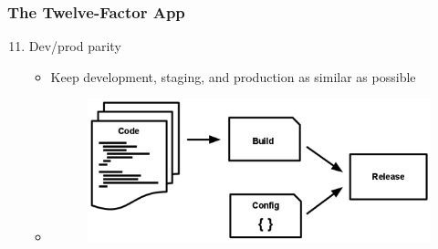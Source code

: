 \documentclass{beamer}
\begin{document}
	\begin{frame}
		\frametitle{The Twelve-Factor App}
		\begin{enumerate}
			\setcounter{enumi}{10}
			\item Dev/prod parity \\
			\begin{itemize}
				\item<1->[] \scriptsize{Keep development, staging, and production as similar as possible}
				\vspace{5mm}
				\item<1->[] 
				\begin{figure}[h]
					\includegraphics[width=100mm,scale=1]{img/release.png}
				\end{figure}
			\end{itemize}
		\end{enumerate}
		\vspace{100mm}
	\end{frame}
\end{document}
